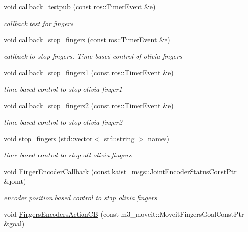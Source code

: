 \begin{DoxyCompactItemize}
void \hyperlink{classM3MoveGroup_a9b982c9f3cd26755ed9b6ecca1286c50}{callback\+\_\+testpub} (const ros\+::\+Timer\+Event \&e)
\begin{DoxyCompactList}\small\item\em callback test for fingers \end{DoxyCompactList}\item 
void \hyperlink{classM3MoveGroup_a1a515c13453033a4ab89b5599d58f23f}{callback\+\_\+stop\+\_\+fingers} (const ros\+::\+Timer\+Event \&e)
\begin{DoxyCompactList}\small\item\em callback to stop fingers. Time based control of olivia fingers \end{DoxyCompactList}\item 
void \hyperlink{classM3MoveGroup_af7c4ca891be62a8c3fdb7cd0cc0cb2a0}{callback\+\_\+stop\+\_\+fingers1} (const ros\+::\+Timer\+Event \&e)
\begin{DoxyCompactList}\small\item\em time-\/based control to stop olivia finger1 \end{DoxyCompactList}\item 
void \hyperlink{classM3MoveGroup_af6a7a1d4aab641328a9213689f7b9ce1}{callback\+\_\+stop\+\_\+fingers2} (const ros\+::\+Timer\+Event \&e)
\begin{DoxyCompactList}\small\item\em time based control to stop olivia finger2 \end{DoxyCompactList}\item 
void \hyperlink{classM3MoveGroup_aedb5d4a4aaeebd2ef3fa0d54edb0efaa}{stop\+\_\+fingers} (std\+::vector$<$ std\+::string $>$ names)
\begin{DoxyCompactList}\small\item\em time based control to stop all olivia fingers \end{DoxyCompactList}\item 
void \hyperlink{classM3MoveGroup_a7208ba7725391ea9ffd98d3d31ae5f0d}{Finger\+Encoder\+Callback} (const kaist\+\_\+msgs\+::\+Joint\+Encoder\+Status\+Const\+Ptr \&joint)
\begin{DoxyCompactList}\small\item\em encoder position based control to stop olivia fingers \end{DoxyCompactList}\item 
void \hyperlink{classM3MoveGroup_ab202574f8621d26c6369c1b794014251}{Fingers\+Encoders\+Action\+CB} (const m3\+\_\+moveit\+::\+Moveit\+Fingers\+Goal\+Const\+Ptr \&goal)

\end{DoxyCompactItemize}

